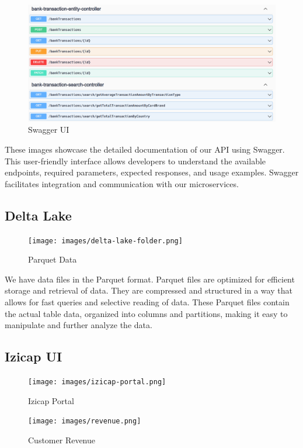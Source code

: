 \begin{figure}[H]
\centering
\includegraphics[width=\linewidth]{images/Swagger-UI-3.png}
\caption{Swagger UI}\label{fig:swagger-4}
\end{figure}

These images showcase the detailed documentation of our API using Swagger. This user-friendly interface allows developers to understand the available endpoints, required parameters, expected responses, and usage examples. Swagger facilitates integration and communication with our microservices.

\subsection{Delta Lake}

\begin{figure}[H]
\centering
\texttt{[image: images/delta-lake-folder.png]}
\caption{Parquet Data}\label{fig:delta-lake-folder}
\end{figure}

We have data files in the Parquet format. Parquet files are optimized for efficient storage and retrieval of data. They are compressed and structured in a way that allows for fast queries and selective reading of data. These Parquet files contain the actual table data, organized into columns and partitions, making it easy to manipulate and further analyze the data.

\subsection{Izicap UI}

\begin{figure}[H]
\centering
\texttt{[image: images/izicap-portal.png]}
\caption{Izicap Portal}\label{fig:izicap-1}
\end{figure}

\begin{figure}[H]
\centering
\texttt{[image: images/revenue.png]}
\caption{Customer Revenue}\label{fig:izicap-2}
\end{figure}

